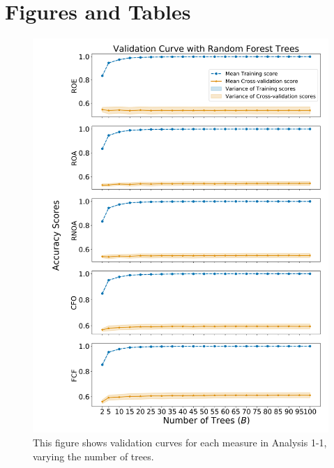 \clearpage

\section{Figures and Tables}


\begin{figure}[htb!]
    \centering
    \includegraphics[width=\textwidth,height=0.87\textheight,keepaspectratio]{figures/ABIS/analysis_1-1_ValidationCurveTrees.png}

   \caption{This figure shows validation curves for each measure in Analysis 1-1, varying the number of trees. }
      \label{fig:ValidationCurve-A1-Trees}
\end{figure}


